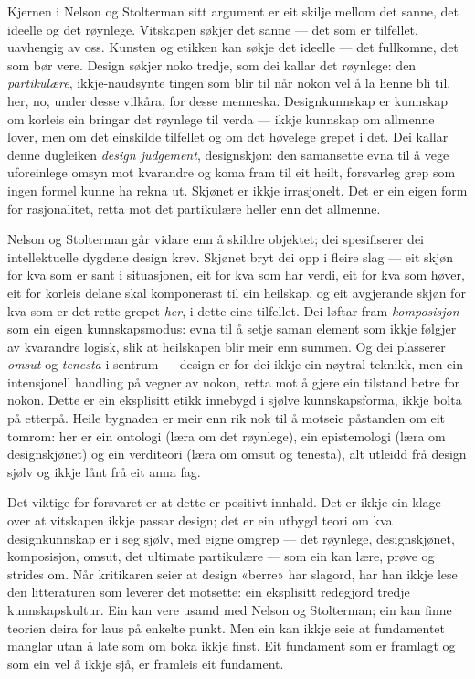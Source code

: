 Kjernen i Nelson og Stolterman sitt argument er eit skilje mellom det sanne, det ideelle og det røynlege. Vitskapen søkjer det sanne — det som er tilfellet, uavhengig av oss. Kunsten og etikken kan søkje det ideelle — det fullkomne, det som bør vere. Design søkjer noko tredje, som dei kallar det røynlege: den \emph{partikulære}, ikkje-naudsynte tingen som blir til når nokon vel å la henne bli til, her, no, under desse vilkåra, for desse menneska. Designkunnskap er kunnskap om korleis ein bringar det røynlege til verda — ikkje kunnskap om allmenne lover, men om det einskilde tilfellet og om det høvelege grepet i det. Dei kallar denne dugleiken \emph{design judgement}, designskjøn: den samansette evna til å vege uforeinlege omsyn mot kvarandre og koma fram til eit heilt, forsvarleg grep som ingen formel kunne ha rekna ut. Skjønet er ikkje irrasjonelt. Det er ein eigen form for rasjonalitet, retta mot det partikulære heller enn det allmenne.

Nelson og Stolterman går vidare enn å skildre objektet; dei spesifiserer dei intellektuelle dygdene design krev. Skjønet bryt dei opp i fleire slag — eit skjøn for kva som er sant i situasjonen, eit for kva som har verdi, eit for kva som høver, eit for korleis delane skal komponerast til ein heilskap, og eit avgjerande skjøn for kva som er det rette grepet \emph{her}, i dette eine tilfellet. Dei løftar fram \emph{komposisjon} som ein eigen kunnskapsmodus: evna til å setje saman element som ikkje følgjer av kvarandre logisk, slik at heilskapen blir meir enn summen. Og dei plasserer \emph{omsut} og \emph{tenesta} i sentrum — design er for dei ikkje ein nøytral teknikk, men ein intensjonell handling på vegner av nokon, retta mot å gjere ein tilstand betre for nokon. Dette er ein eksplisitt etikk innebygd i sjølve kunnskapsforma, ikkje bolta på etterpå. Heile bygnaden er meir enn rik nok til å motseie påstanden om eit tomrom: her er ein ontologi (læra om det røynlege), ein epistemologi (læra om designskjønet) og ein verditeori (læra om omsut og tenesta), alt utleidd frå design sjølv og ikkje lånt frå eit anna fag.

Det viktige for forsvaret er at dette er positivt innhald. Det er ikkje ein klage over at vitskapen ikkje passar design; det er ein utbygd teori om kva designkunnskap er i seg sjølv, med eigne omgrep — det røynlege, designskjønet, komposisjon, omsut, det ultimate partikulære — som ein kan lære, prøve og strides om. Når kritikaren seier at design «berre» har slagord, har han ikkje lese den litteraturen som leverer det motsette: ein eksplisitt redegjord tredje kunnskapskultur. Ein kan vere usamd med Nelson og Stolterman; ein kan finne teorien deira for laus på enkelte punkt. Men ein kan ikkje seie at fundamentet manglar utan å late som om boka ikkje finst. Eit fundament som er framlagt og som ein vel å ikkje sjå, er framleis eit fundament.

